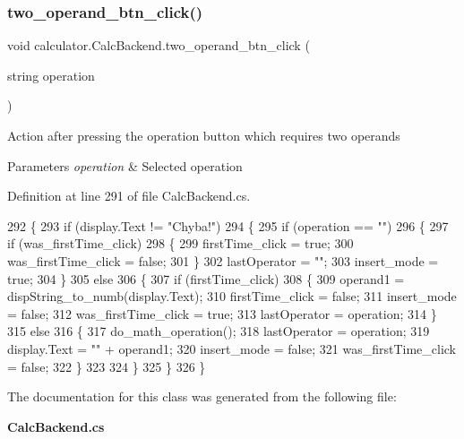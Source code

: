 \subsubsection{two\+\_\+operand\+\_\+btn\+\_\+click()}
{\footnotesize\ttfamily void calculator.\+Calc\+Backend.\+two\+\_\+operand\+\_\+btn\+\_\+click (\begin{DoxyParamCaption}\item[{string}]{operation }\end{DoxyParamCaption})}



Action after pressing the operation button which requires two operands 


\begin{DoxyParams}{Parameters}
{\em operation} & Selected operation\\
\hline
\end{DoxyParams}


Definition at line 291 of file Calc\+Backend.\+cs.


\begin{DoxyCode}
292         \{
293             \textcolor{keywordflow}{if} (display.Text != \textcolor{stringliteral}{"Chyba!"})
294             \{
295                 \textcolor{keywordflow}{if} (operation == \textcolor{stringliteral}{""})
296                 \{
297                     \textcolor{keywordflow}{if} (was\_firstTime\_click)
298                     \{
299                         firstTime\_click = \textcolor{keyword}{true};
300                         was\_firstTime\_click = \textcolor{keyword}{false};
301                     \}
302                     lastOperator = \textcolor{stringliteral}{""};
303                     insert\_mode = \textcolor{keyword}{true};
304                 \}
305                 \textcolor{keywordflow}{else}
306                 \{
307                     \textcolor{keywordflow}{if} (firstTime\_click)
308                     \{
309                         operand1 = dispString\_to\_numb(display.Text);
310                         firstTime\_click = \textcolor{keyword}{false};
311                         insert\_mode = \textcolor{keyword}{false};
312                         was\_firstTime\_click = \textcolor{keyword}{true};
313                         lastOperator = operation;
314                     \}
315                     \textcolor{keywordflow}{else}
316                     \{
317                         do\_math\_operation();
318                         lastOperator = operation;
319                         display.Text = \textcolor{stringliteral}{""} + operand1;
320                         insert\_mode = \textcolor{keyword}{false};
321                         was\_firstTime\_click = \textcolor{keyword}{false};
322                     \}
323 
324                 \}
325             \}
326         \}
\end{DoxyCode}


The documentation for this class was generated from the following file\+:\begin{DoxyCompactItemize}
\item 
\textbf{ Calc\+Backend.\+cs}\end{DoxyCompactItemize}
